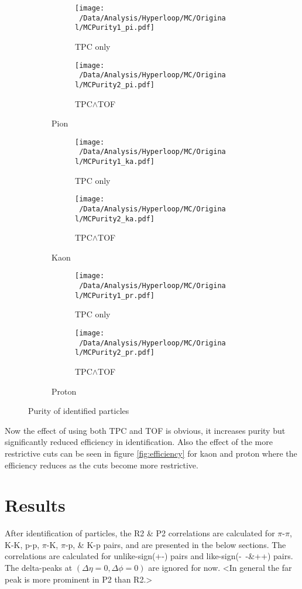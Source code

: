 \documentclass[12pt,a4paper,twoside]{report}
\begin{document}
\begin{figure}[H]
	\begin{subfigure}{\linewidth}
		\begin{subfigure}{0.49\linewidth}
			\texttt{[image: ~/Data/Analysis/Hyperloop/MC/Original/MCPurity1\_pi.pdf]}
			\caption*{TPC only}
		\end{subfigure}
		\begin{subfigure}{0.49\linewidth}
			\texttt{[image: ~/Data/Analysis/Hyperloop/MC/Original/MCPurity2\_pi.pdf]}
			\caption*{TPC$\land$TOF}
		\end{subfigure}
		\caption{Pion}
	\end{subfigure}
	\begin{subfigure}{\linewidth}
		\begin{subfigure}{0.49\linewidth}
			\texttt{[image: ~/Data/Analysis/Hyperloop/MC/Original/MCPurity1\_ka.pdf]}
			\caption*{TPC only}
		\end{subfigure}
		\begin{subfigure}{0.49\linewidth}
			\texttt{[image: ~/Data/Analysis/Hyperloop/MC/Original/MCPurity2\_ka.pdf]}
			\caption*{TPC$\land$TOF}
		\end{subfigure}
		\caption{Kaon}
	\end{subfigure}
	\begin{subfigure}{\linewidth}
		\begin{subfigure}{0.49\linewidth}
			\texttt{[image: ~/Data/Analysis/Hyperloop/MC/Original/MCPurity1\_pr.pdf]}
			\caption*{TPC only}
		\end{subfigure}
		\begin{subfigure}{0.49\linewidth}
			\texttt{[image: ~/Data/Analysis/Hyperloop/MC/Original/MCPurity2\_pr.pdf]}
			\caption*{TPC$\land$TOF}
		\end{subfigure}
		\caption{Proton}
	\end{subfigure}
	\caption{\label{fig:purity}Purity of identified particles}
\end{figure}
Now the effect of using both TPC and TOF is obvious, it increases purity but significantly reduced efficiency in identification. Also the effect of the more restrictive cuts can be seen in figure \ref{fig:efficiency} for kaon and proton where the efficiency reduces as the cuts become more restrictive.
\chapter{Results}\label{Ch:Results}
After identification of particles, the R2 \& P2 correlations are calculated for $\pi$-$\pi$, K-K, p-p, $\pi$-K, $\pi$-p, \& K-p pairs, and are presented in the below sections. The correlations are calculated for unlike-sign(+-) pairs and like-sign(-\ -\&++) pairs. The delta-peaks at $(\Delta\eta=0,\Delta\phi=0)$ are ignored for now.
<In general the far peak is more prominent in P2 than R2.>
\end{document}
